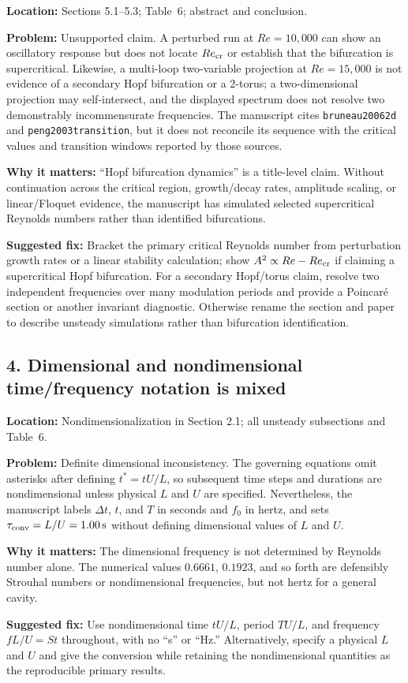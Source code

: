 \documentclass[11pt]{article}
\newcommand{\location}[1]{\textbf{Location:} #1\par}
\newcommand{\problem}[1]{\textbf{Problem:} #1\par}
\newcommand{\impact}[1]{\textbf{Why it matters:} #1\par}
\newcommand{\fixit}[1]{\textbf{Suggested fix:} #1\par}
\begin{document}
\location{Sections 5.1--5.3; Table~6; abstract and conclusion.}
\problem{Unsupported claim.  A perturbed run at $Re=10{,}000$ can show an oscillatory response but does not locate $Re_{\rm cr}$ or establish that the bifurcation is supercritical.  Likewise, a multi-loop two-variable projection at $Re=15{,}000$ is not evidence of a secondary Hopf bifurcation or a 2-torus; a two-dimensional projection may self-intersect, and the displayed spectrum does not resolve two demonstrably incommensurate frequencies.  The manuscript cites \texttt{bruneau20062d} and \texttt{peng2003transition}, but it does not reconcile its sequence with the critical values and transition windows reported by those sources.}
\impact{``Hopf bifurcation dynamics'' is a title-level claim.  Without continuation across the critical region, growth/decay rates, amplitude scaling, or linear/Floquet evidence, the manuscript has simulated selected supercritical Reynolds numbers rather than identified bifurcations.}
\fixit{Bracket the primary critical Reynolds number from perturbation growth rates or a linear stability calculation; show $A^2\propto Re-Re_{\rm cr}$ if claiming a supercritical Hopf bifurcation.  For a secondary Hopf/torus claim, resolve two independent frequencies over many modulation periods and provide a Poincar\'e section or another invariant diagnostic.  Otherwise rename the section and paper to describe unsteady simulations rather than bifurcation identification.}

\subsection*{4. Dimensional and nondimensional time/frequency notation is mixed}

\location{Nondimensionalization in Section 2.1; all unsteady subsections and Table~6.}
\problem{Definite dimensional inconsistency.  The governing equations omit asterisks after defining $t^*=tU/L$, so subsequent time steps and durations are nondimensional unless physical $L$ and $U$ are specified.  Nevertheless, the manuscript labels $\Delta t$, $t$, and $T$ in seconds and $f_0$ in hertz, and sets $\tau_{\rm conv}=L/U=1.00\,\mathrm{s}$ without defining dimensional values of $L$ and $U$.}
\impact{The dimensional frequency is not determined by Reynolds number alone.  The numerical values $0.6661$, $0.1923$, and so forth are defensibly Strouhal numbers or nondimensional frequencies, but not hertz for a general cavity.}
\fixit{Use nondimensional time $tU/L$, period $TU/L$, and frequency $fL/U=St$ throughout, with no ``s'' or ``Hz.''  Alternatively, specify a physical $L$ and $U$ and give the conversion while retaining the nondimensional quantities as the reproducible primary results.}
\end{document}
